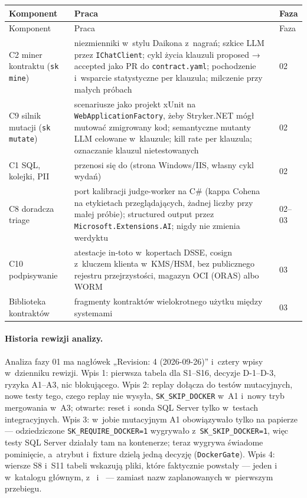 {\footnotesize
\begin{xltabular}{\linewidth}{@{}>{\raggedright\arraybackslash}p{3.5cm} >{\raggedright\arraybackslash}X l@{}}
\toprule
Komponent & Praca & Faza \\
\midrule
\endfirsthead
\toprule
Komponent & Praca & Faza \\
\midrule
\endhead
\bottomrule
\endlastfoot
C2 miner kontraktu (\texttt{sk mine}) & niezmienniki w~stylu Daikona z~nagrań; szkice LLM
przez \texttt{IChatClient}; cykl życia klauzuli proposed → accepted jako PR do
\texttt{contract.yaml}; pochodzenie i~wsparcie statystyczne per klauzula; milczenie przy
małych próbach & 02 \\
C9 silnik mutacji (\texttt{sk mutate}) & scenariusze jako projekt xUnit na
\texttt{WebApplicationFactory}, żeby Stryker.NET mógł mutować zmigrowany kod; semantyczne
mutanty LLM celowane w~klauzule; kill rate per klauzula; oznaczanie klauzul nietestowanych &
02 \\
C1 SQL, kolejki, PII & przenosi się do  (strona
Windows/IIS, własny cykl wydań) & 02 \\
C8 doradcza triage & port kalibracji judge-worker na C\# (kappa Cohena na etykietach
przeglądających, żadnej liczby przy małej próbie); structured output przez
\texttt{Microsoft.Extensions.AI}; nigdy nie zmienia werdyktu & 02–03 \\
C10 podpisywanie & atestacje in-toto w~kopertach DSSE, cosign z~kluczem klienta w~KMS/HSM,
bez publicznego rejestru przejrzystości, magazyn OCI (ORAS) albo WORM & 03 \\
Biblioteka kontraktów & fragmenty kontraktów wielokrotnego użytku między systemami & 03 \\
\end{xltabular}
}

\paragraph{Historia rewizji analizy.} Analiza fazy 01 ma nagłówek „Revision: 4
(2026-09-26)” i~cztery wpisy w~dzienniku rewizji. Wpis 1: pierwsza tabela dla S1–S16,
decyzje D-1–D-3, ryzyka A1–A3, nic blokującego. Wpis 2: replay dołącza do testów
mutacyjnych, nowe testy tego, czego replay nie wysyła, \texttt{SK\_SKIP\_DOCKER} w~A1 i~nowy tryb mergowania w~A3; otwarte: reset i~sonda SQL Server tylko w~testach
integracyjnych. Wpis 3: w~jobie mutacyjnym A1 obowiązywało tylko na papierze ---
odziedziczone \texttt{SK\_REQUIRE\_DOCKER=1} wygrywało z~\texttt{SK\_SKIP\_DOCKER=1}, więc
testy SQL Server działały tam na kontenerze; teraz wygrywa świadome pominięcie, a~atrybut
i~fixture dzielą jedną decyzję (\texttt{DockerGate}). Wpis 4: wiersze S8 i~S11 tabeli
wskazują pliki, które faktycznie powstały --- jeden 
i~ w~katalogu głównym,  z~
i~ --- zamiast nazw zaplanowanych w~pierwszym przebiegu.

